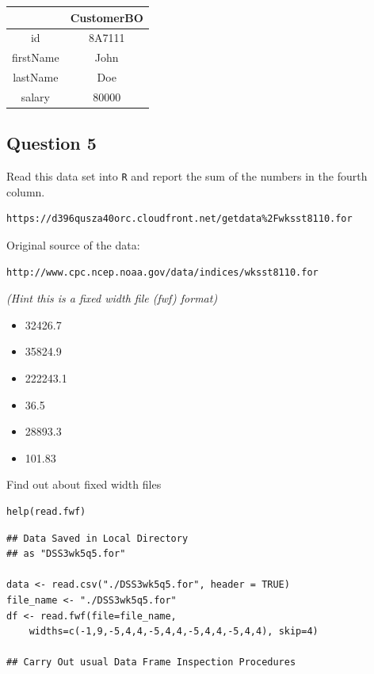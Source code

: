 \begin{center}
\bigskip
\begin{tabular}{|c|c|}
	\hline  & CustomerBO \\ \hline
	 id & 8A7111 \\ 
	 firstName  & John  \\ 
	 lastName & Doe \\ 
	 salary & 80000 \\ 
	\hline 
\end{tabular} 
\end{center}
\newpage
\subsection*{Question 5}
Read this data set into \texttt{R} and report the sum of the numbers in the fourth column. 
\begin{verbatim}
https://d396qusza40orc.cloudfront.net/getdata%2Fwksst8110.for 
\end{verbatim} 

\noindent Original source of the data:
\begin{verbatim}
http://www.cpc.ncep.noaa.gov/data/indices/wksst8110.for 
\end{verbatim} 

\noindent \textit{(Hint this is a fixed width file (fwf) format)}
\begin{itemize}
\item[(i)] 32426.7
\item[(ii)] 35824.9
\item[(iii)] 222243.1
\item[(iv)] 36.5
\item[(v)] 28893.3
\item[(vi)] 101.83
\end{itemize}

\begin{framed}
\noindent Find out about fixed width files
\begin{verbatim}
help(read.fwf)
\end{verbatim}	
\end{framed}
\newpage

\begin{framed}
\begin{verbatim}
## Data Saved in Local Directory
## as "DSS3wk5q5.for"

data <- read.csv("./DSS3wk5q5.for", header = TRUE)
file_name <- "./DSS3wk5q5.for"
df <- read.fwf(file=file_name,
    widths=c(-1,9,-5,4,4,-5,4,4,-5,4,4,-5,4,4), skip=4)

## Carry Out usual Data Frame Inspection Procedures
\end{verbatim}	
\end{framed}

